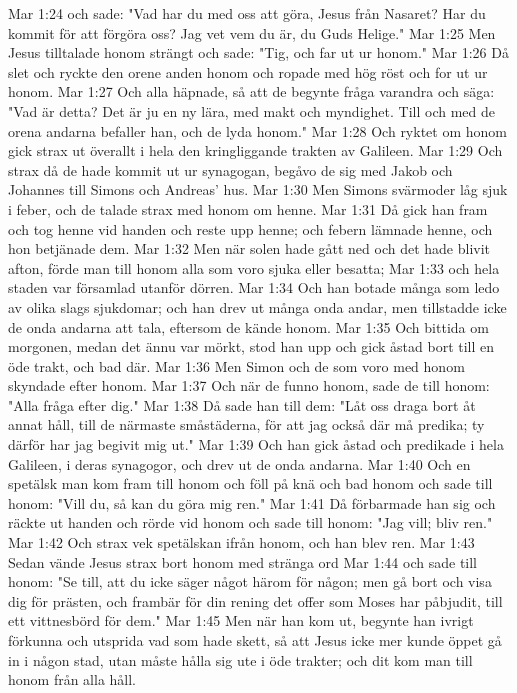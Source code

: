 Mar 1:24  och sade: "Vad har du med oss att göra, Jesus från Nasaret? Har du kommit för att förgöra oss? Jag vet vem du är, du Guds Helige."
Mar 1:25  Men Jesus tilltalade honom strängt och sade: "Tig, och far ut ur honom."
Mar 1:26  Då slet och ryckte den orene anden honom och ropade med hög röst och for ut ur honom.
Mar 1:27  Och alla häpnade, så att de begynte fråga varandra och säga: "Vad är detta? Det är ju en ny lära, med makt och myndighet. Till och med de orena andarna befaller han, och de lyda honom."
Mar 1:28  Och ryktet om honom gick strax ut överallt i hela den kringliggande trakten av Galileen.
Mar 1:29  Och strax då de hade kommit ut ur synagogan, begåvo de sig med Jakob och Johannes till Simons och Andreas' hus.
Mar 1:30  Men Simons svärmoder låg sjuk i feber, och de talade strax med honom om henne.
Mar 1:31  Då gick han fram och tog henne vid handen och reste upp henne; och febern lämnade henne, och hon betjänade dem.
Mar 1:32  Men när solen hade gått ned och det hade blivit afton, förde man till honom alla som voro sjuka eller besatta;
Mar 1:33  och hela staden var församlad utanför dörren.
Mar 1:34  Och han botade många som ledo av olika slags sjukdomar; och han drev ut många onda andar, men tillstadde icke de onda andarna att tala, eftersom de kände honom.
Mar 1:35  Och bittida om morgonen, medan det ännu var mörkt, stod han upp och gick åstad bort till en öde trakt, och bad där.
Mar 1:36  Men Simon och de som voro med honom skyndade efter honom.
Mar 1:37  Och när de funno honom, sade de till honom: "Alla fråga efter dig."
Mar 1:38  Då sade han till dem: "Låt oss draga bort åt annat håll, till de närmaste småstäderna, för att jag också där må predika; ty därför har jag begivit mig ut."
Mar 1:39  Och han gick åstad och predikade i hela Galileen, i deras synagogor, och drev ut de onda andarna.
Mar 1:40  Och en spetälsk man kom fram till honom och föll på knä och bad honom och sade till honom: "Vill du, så kan du göra mig ren."
Mar 1:41  Då förbarmade han sig och räckte ut handen och rörde vid honom och sade till honom: "Jag vill; bliv ren."
Mar 1:42  Och strax vek spetälskan ifrån honom, och han blev ren.
Mar 1:43  Sedan vände Jesus strax bort honom med stränga ord
Mar 1:44  och sade till honom: "Se till, att du icke säger något härom för någon; men gå bort och visa dig för prästen, och frambär för din rening det offer som Moses har påbjudit, till ett vittnesbörd för dem."
Mar 1:45  Men när han kom ut, begynte han ivrigt förkunna och utsprida vad som hade skett, så att Jesus icke mer kunde öppet gå in i någon stad, utan måste hålla sig ute i öde trakter; och dit kom man till honom från alla håll.
